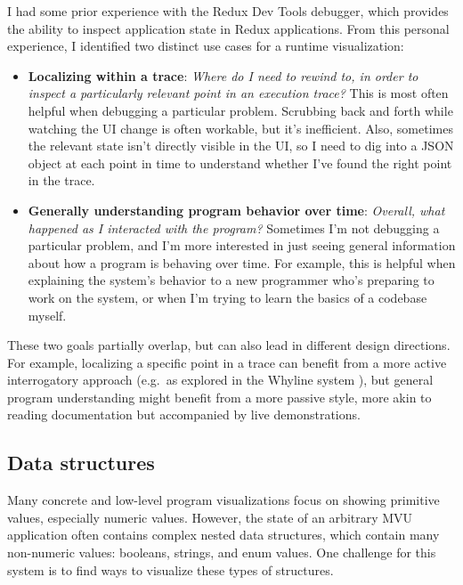 \documentclass{sigchi}
\providecommand{\tightlist}{%
  \setlength{\itemsep}{0pt}\setlength{\parskip}{0pt}}
\begin{document}
I had some prior experience with the Redux Dev Tools debugger, which
provides the ability to inspect application state in Redux applications.
From this personal experience, I identified two distinct use cases for a
runtime visualization:

\begin{itemize}
\tightlist
\item
  \textbf{Localizing within a trace}: \emph{Where do I need to rewind
  to, in order to inspect a particularly relevant point in an execution
  trace?} This is most often helpful when debugging a particular
  problem. Scrubbing back and forth while watching the UI change is
  often workable, but it's inefficient. Also, sometimes the relevant
  state isn't directly visible in the UI, so I need to dig into a JSON
  object at each point in time to understand whether I've found the
  right point in the trace.
\item
  \textbf{Generally understanding program behavior over time}:
  \emph{Overall, what happened as I interacted with the program?}
  Sometimes I'm not debugging a particular problem, and I'm more
  interested in just seeing general information about how a program is
  behaving over time. For example, this is helpful when explaining the
  system's behavior to a new programmer who's preparing to work on the
  system, or when I'm trying to learn the basics of a codebase myself.
\end{itemize}

These two goals partially overlap, but can also lead in different design
directions. For example, localizing a specific point in a trace can
benefit from a more active interrogatory approach (e.g.~as explored in
the Whyline system \autocite{ko2004}), but general program understanding
might benefit from a more passive style, more akin to reading
documentation but accompanied by live demonstrations.

\hypertarget{data-structures}{%
\subsection{Data structures}\label{data-structures}}

Many concrete and low-level program visualizations focus on showing
primitive values, especially numeric values. However, the state of an
arbitrary MVU application often contains complex nested data structures,
which contain many non-numeric values: booleans, strings, and enum
values. One challenge for this system is to find ways to visualize these
types of structures.
\end{document}
